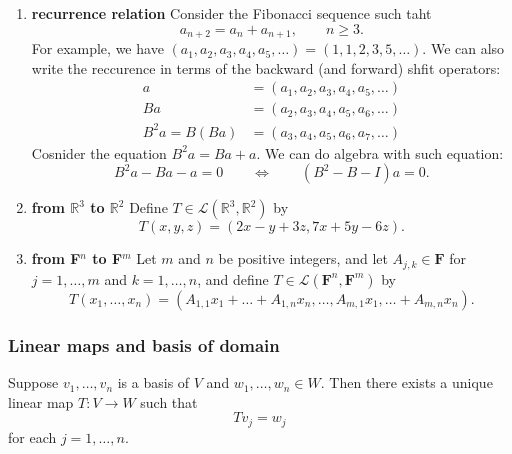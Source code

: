 \documentclass[11pt]{article}
\begin{document}
\begin{enumerate}
        \item \textbf{recurrence relation} Consider the Fibonacci sequence such taht \[a_{n+2} = a_n + a_{n+1}, \qquad n \geq 3.\] For example, we have \((a_1, a_2, a_3, a_4, a_5, \dots) = (1,1,2,3,5, \dots). \) We can also write the reccurence in terms of the backward (and forward) shfit operators:
        \begin{align*}
            a &= (a_1, a_2, a_3, a_4, a_5, \dots) \\
            Ba &= (a_2, a_3, a_4, a_5, a_6, \dots) \\
            B^2 a = B(Ba) &= (a_3, a_4, a_5, a_6, a_7, \dots)
        \end{align*}
        Cosnider the equation \(B^2 a = Ba + a\). We can do algebra with such equation: \[B^2 a - Ba - a = 0 \qquad \Leftrightarrow \qquad (B^2 - B - I)a = 0.\]
        \item \textbf{from \(\mathbb{R}^3\) to \(\mathbb{R}^2\)} Define \(T \in \mathcal{L}(\mathbb{R}^3, \mathbb{R}^2)\) by \[T(x,y,z) = (2x-y + 3z, 7x + 5y - 6z).\]
        \item \textbf{from \textbf{F}\(^n\) to \textbf{F}\(^m\)} Let $m$ and $n$ be positive integers, and let \(A_{j,k} \in \textbf{F}\) for \(j = 1, \dots, m\) and \(k = 1, \dots, n\), and define \(T \in \mathcal{L}(\textbf{F}^n, \textbf{F}^m)\) by \[T(x_1, \dots, x_n) = (A_{1,1} x_1 + \dots + A_{1,n} x_n, \dots, A_{m,1} x_1, \dots + A_{m,n} x_n).\]
    \end{enumerate}

    \subsubsection{Linear maps and basis of domain}

    Suppose \(v_1, \dots, v_n\) is a basis of $V$  and \(w_1, \dots, w_n \in W\). Then there exists a unique linear map \(T:V \rightarrow W\) such that \[Tv_j = w_j\] for each \(j = 1, \dots, n\).
\end{document}
